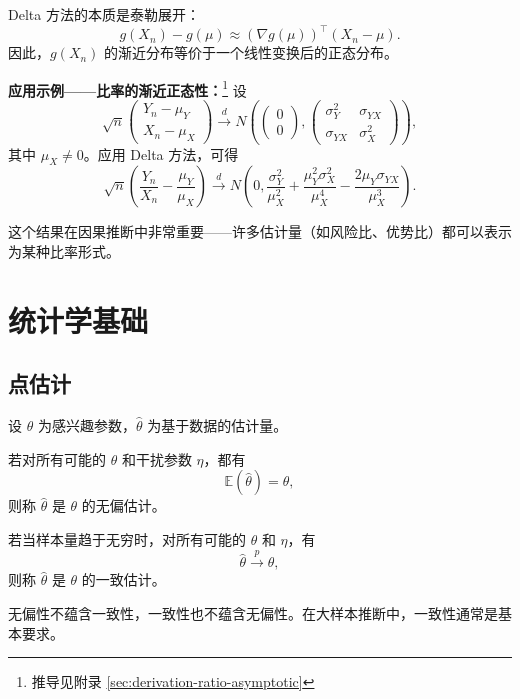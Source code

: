 Delta 方法的本质是泰勒展开：
\[
g(X_n) - g(\mu) \approx (\nabla g(\mu))^\top (X_n - \mu).
\]
因此，$g(X_n)$ 的渐近分布等价于一个线性变换后的正态分布。

\textbf{应用示例——比率的渐近正态性：}\footnote{推导见附录 \cref{sec:derivation-ratio-asymptotic}} 设
\[
\sqrt{n}\begin{pmatrix} Y_n - \mu_Y \\ X_n - \mu_X \end{pmatrix} \xrightarrow{d} N\left(\begin{pmatrix} 0 \\ 0 \end{pmatrix}, \begin{pmatrix} \sigma_Y^2 & \sigma_{YX} \\ \sigma_{YX} & \sigma_X^2 \end{pmatrix}\right),
\]
其中 $\mu_X \neq 0$。应用 Delta 方法，可得
\[
\sqrt{n}\left(\frac{Y_n}{X_n} - \frac{\mu_Y}{\mu_X}\right) \xrightarrow{d} N\left(0, \frac{\sigma_Y^2}{\mu_X^2} + \frac{\mu_Y^2\sigma_X^2}{\mu_X^4} - \frac{2\mu_Y\sigma_{YX}}{\mu_X^3}\right).
\]

这个结果在因果推断中非常重要——许多估计量（如风险比、优势比）都可以表示为某种比率形式。

\section{统计学基础}

\subsection{点估计}

设 $\theta$ 为感兴趣参数，$\hat{\theta}$ 为基于数据的估计量。

\begin{Definition}[无偏性]\label{def:unbiasedness}
若对所有可能的 $\theta$ 和干扰参数 $\eta$，都有
\[
\mathbb{E}(\hat{\theta}) = \theta,
\]
则称 $\hat{\theta}$ 是 $\theta$ 的无偏估计。
\end{Definition}

\begin{Definition}[一致性]\label{def:consistency}
若当样本量趋于无穷时，对所有可能的 $\theta$ 和 $\eta$，有
\[
\hat{\theta} \xrightarrow{p} \theta,
\]
则称 $\hat{\theta}$ 是 $\theta$ 的一致估计。
\end{Definition}

无偏性不蕴含一致性，一致性也不蕴含无偏性。在大样本推断中，一致性通常是基本要求。

